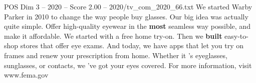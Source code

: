 \begin{textsample}{POS Dim 3 – 2020 – Score 2.00 – 2020/tv\_com\_2020\_66.txt}  \label{ex:f3_pos_066}
We started Warby Parker in 2010 to change the way people buy glasses.
Our big idea was actually quite simple.
Offer high-quality eyewear in the \textbf{most} seamless way possible, and make it affordable.
We started with a free home try-on.
Then we \textbf{built} easy-to-shop stores that offer eye exams.
And today, we have apps that let you try on frames and renew your prescription from home.
Whether it 's eyeglasses, sunglasses, or contacts, we 've got your eyes covered.
For more information, visit www.fema.gov

\end{textsample}
